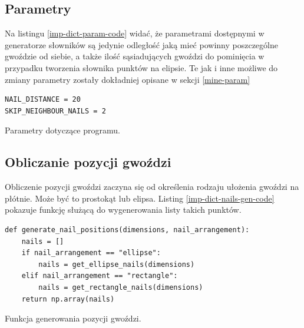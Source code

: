 \documentclass[a4paper, 12pt, polish, twoside]{extreport}
\begin{document}
        \subsection{Parametry} \label{imp-dict-param}
        Na listingu \ref{imp-dict-param-code} widać, że parametrami dostępnymi w generatorze słowników są jedynie odległość jaką mieć powinny poszczególne gwoździe od siebie, a także ilość sąsiadujących gwoździ do pominięcia w przypadku tworzenia słownika punktów na elipsie. Te jak i inne możliwe do zmiany parametry zostały dokładniej opisane w sekcji \ref{mine-param}
        \begin{code}[H]
        \begin{verbatim}
NAIL_DISTANCE = 20
SKIP_NEIGHBOUR_NAILS = 2
        \end{verbatim}
        \caption{Parametry dotyczące programu.}
        \label{imp-dict-param-code}
        \end{code}
        
        \subsection{Obliczanie pozycji gwoździ} \label{imp-dict-nails}
        Obliczenie pozycji gwoździ zaczyna się od określenia rodzaju ułożenia gwoździ na płótnie. Może być to prostokąt lub elipsa. Listing \ref{imp-dict-nails-gen-code} pokazuje funkcję służącą do wygenerowania listy takich punktów.
        \begin{code}[H]
        \begin{verbatim}
def generate_nail_positions(dimensions, nail_arrangement):
    nails = []
    if nail_arrangement == "ellipse":
        nails = get_ellipse_nails(dimensions)
    elif nail_arrangement == "rectangle":
        nails = get_rectangle_nails(dimensions)
    return np.array(nails)
        \end{verbatim}
        \caption{Funkcja generowania pozycji gwoździ.}
        \label{imp-dict-nails-gen-code}
        \end{code}
        
\end{document}
